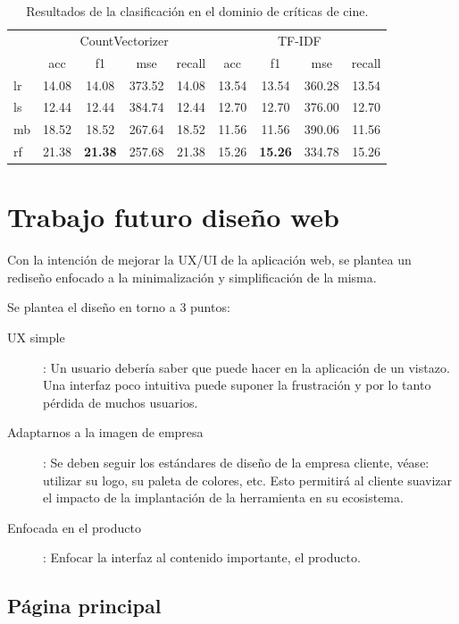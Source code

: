 \begin{table}[H]
	\centering
	\begin{tabular}{|l|cccc|cccc|}
		\hline
		& \multicolumn{4}{c|}{CountVectorizer} & \multicolumn{4}{c|}{TF-IDF} \\
		\cline{2-9}
		&    acc &     f1 &    mse &  recall & acc &     f1 &    mse &  recall \\
		\hline
		lr      &  14.08 &  14.08 &  373.52 &   14.08 &  13.54 &  13.54 &  360.28 &   13.54\\
		ls      &  12.44 &  12.44 &  384.74 &   12.44 &  12.70 &  12.70 &  376.00 &   12.70\\
		mb      &  18.52 &  18.52 &  267.64 &   18.52 &  11.56 &  11.56 &  390.06 &   11.56 \\
		rf      &  21.38 &  \textbf{21.38} &  257.68 &   21.38 &  15.26 &  \textbf{15.26} &  334.78 &   15.26 \\
		\hline
	\end{tabular}
	\caption{Resultados de la clasificación en el dominio de críticas de cine.}
	\label{result-cv-test-5-clases-cine}
\end{table}

\section{Trabajo futuro diseño web}

Con la intención de mejorar la UX/UI de la aplicación web, se plantea un rediseño enfocado a la minimalización y simplificación de la misma.

Se plantea el diseño en torno a 3 puntos:

\begin{description}
	\item [UX simple]: Un usuario debería saber que puede hacer en la aplicación de un vistazo. Una interfaz poco intuitiva puede suponer la frustración y por lo tanto pérdida de muchos usuarios.
	\item [Adaptarnos a la imagen de empresa]: Se deben seguir los estándares de diseño de la empresa cliente, véase: utilizar su logo, su paleta de colores, etc. Esto permitirá al cliente suavizar el impacto de la implantación de la herramienta en su ecosistema.
	\item [Enfocada en el producto]: Enfocar la interfaz al contenido importante, el producto.
\end{description}

\subsection{Página principal}

